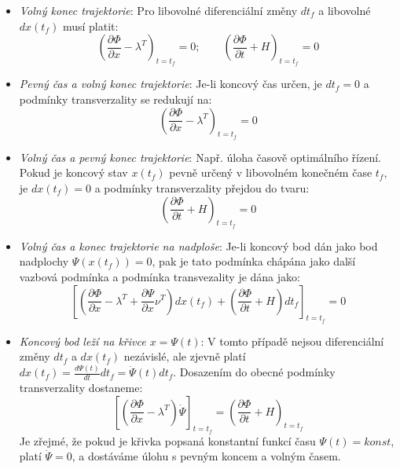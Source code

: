 \begin{itemize}
\item \textit{Volný konec trajektorie}: Pro libovolné diferenciální změny $ dt_f $ a libovolné $ dx(t_f) $ musí platit:
\begin{equation}
\left( \frac{\partial \Phi}{\partial x} - \lambda^T \right)_{t=t_f} = 0; \qquad \left( \frac{\partial \Phi}{\partial t} + H \right)_{t=t_f} = 0
\end{equation}
\item \textit{Pevný čas a volný konec trajektorie}: Je-li koncový čas určen, je $ dt_f = 0 $ a podmínky transverzality se redukují na:
\begin{equation}
\left( \frac{\partial \Phi}{\partial x} - \lambda^T \right)_{t=t_f} = 0
\end{equation}
\item \textit{Volný čas a pevný konec trajektorie}: Např. úloha časově optimálního řízení. Pokud je koncový stav $ x(t_f) $ pevně určený v libovolném konečném čase $ t_f $, je $ dx(t_f) = 0 $ a podmínky transverzality přejdou do tvaru:
\begin{equation}
\left( \frac{\partial \Phi}{\partial t} + H \right)_{t=t_f} = 0
\end{equation}
\item \textit{Volný čas a konec trajektorie na nadploše}: Je-li koncový bod dán jako bod nadplochy $ \Psi (x(t_f)) = 0 $, pak je tato podmínka chápána jako další vazbová podmínka a podmínka transvezality je dána jako:
\begin{equation}
\left[ \left( \frac{\partial \Phi}{\partial x} - \lambda^T + \frac{\partial \Psi}{\partial x} \nu^T \right) dx(t_f) + \left( \frac{\partial \Phi}{\partial t} + H \right) dt_f \right]_{t=t_f} = 0
\end{equation}
\item \textit{Koncový bod leží na křivce $ x = \Psi(t) $}: V tomto případě nejsou diferenciální změny $ dt_f $ a $ dx(t_f) $ nezávislé, ale zjevně platí $ dx(t_f) = \frac{d \Psi(t)}{dt} dt_f = \dot{\Psi}(t) dt_f $. Dosazením do obecné podmínky transverzality dostaneme:
\begin{equation}
\left[ \left( \frac{\partial \Phi}{\partial x} - \lambda^T \right) \dot{\Psi} \right]_{t=t_f} = \left( \frac{\partial \Phi}{\partial t} + H \right)_{t=t_f}
\end{equation}
Je zřejmé, že pokud je křivka popsaná konstantní funkcí času $ \Psi(t) = konst $, platí $ \dot{\Psi} = 0 $, a dostáváme úlohu s pevným koncem a volným časem.
\end{itemize}

